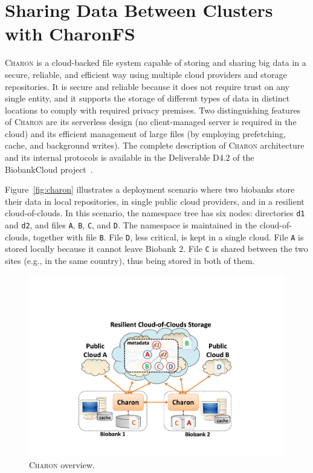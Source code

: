 \section{Sharing Data Between Clusters with CharonFS}
\textsc{Charon} is a cloud-backed file system capable of storing and sharing big data in a secure, reliable, and efficient way using multiple cloud providers and storage repositories. 
It is secure and reliable because it does not require trust on any single entity, and it supports the storage of different types of data in distinct locations to comply with required privacy premises. 
Two distinguishing features of \textsc{Charon} are its serverless design (no client-managed server is required in the cloud) and its efficient management of large files (by employing prefetching, cache, and background writes).
The complete description of \textsc{Charon} architecture and its internal protocols is available in the Deliverable D4.2 of the BiobankCloud project~\cite{D42}.

Figure~\ref{fig:charon} illustrates a deployment scenario where two biobanks store their data in local repositories, in single public cloud providers, and in a resilient cloud-of-clouds. 
In this scenario, the namespace tree has six nodes: directories \texttt{d1} and \texttt{d2}, and files \texttt{A}, \texttt{B}, \texttt{C}, and \texttt{D}. 
The namespace is maintained in the cloud-of-clouds, together with file \texttt{B}.
File \texttt{D}, less critical, is kept in a single cloud.
File \texttt{A} is stored locally because it cannot leave Biobank 2. 
File \texttt{C} is shared between the two sites (e.g., in the same country), thus being stored in both of them.



\begin{figure}[h]
 \centering
 \includegraphics[width=0.75\columnwidth]{./imgs/charon_arch.pdf}
\caption{\small \textsc{Charon} overview.}
\end{figure}


